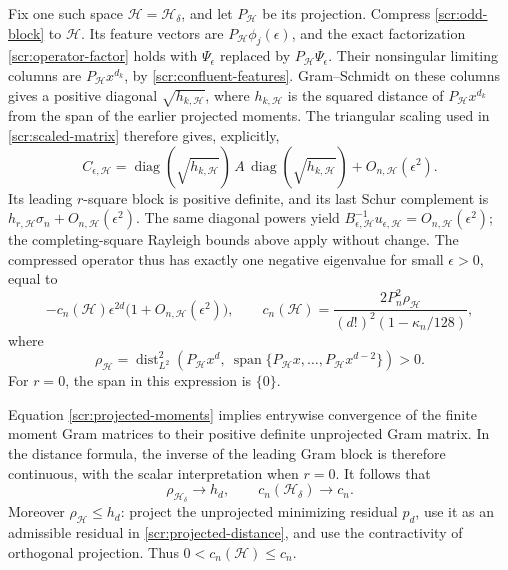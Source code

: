 Fix one such space \(\mathcal H=\mathcal H_\delta\), and let
\(P_{\mathcal H}\) be its projection. Compress
\eqref{scr:odd-block} to \(\mathcal H\). Its feature vectors
are \(P_{\mathcal H}\phi_j(\epsilon)\), and the exact
factorization \eqref{scr:operator-factor} holds with
\(\Psi_\epsilon\) replaced by \(P_{\mathcal H}\Psi_\epsilon\).
Their nonsingular limiting columns are
\(P_{\mathcal H}x^{d_k}\), by \eqref{scr:confluent-features}.
Gram--Schmidt on these columns gives a positive diagonal
\(\sqrt{h_{k,\mathcal H}}\), where \(h_{k,\mathcal H}\)
is the squared distance of \(P_{\mathcal H}x^{d_k}\) from the
span of the earlier projected moments. The triangular scaling
used in \eqref{scr:scaled-matrix} therefore gives, explicitly,
\[
 C_{\epsilon,\mathcal H}
    =\operatorname{diag}(\sqrt{h_{k,\mathcal H}})\,
          A\,\operatorname{diag}(\sqrt{h_{k,\mathcal H}})
                  +O_{n,\mathcal H}(\epsilon^2).
\]
Its leading \(r\)-square block is positive definite, and its
last Schur complement is
\(h_{r,\mathcal H}\sigma_n+O_{n,\mathcal H}(\epsilon^2)\).
The same diagonal powers yield
\(B_{\epsilon,\mathcal H}^{-1}u_{\epsilon,\mathcal H}
=O_{n,\mathcal H}(\epsilon^2)\); the completing-square
Rayleigh bounds above apply without change. The compressed
operator thus has exactly one negative eigenvalue for small
\(\epsilon>0\), equal to
\begin{equation}\label{scr:compressed-eigenvalue}
 -c_n(\mathcal H)\epsilon^{2d}
               \bigl(1+O_{n,\mathcal H}(\epsilon^2)\bigr),
 \qquad
 c_n(\mathcal H)=
   \frac{2P_n^2\rho_{\mathcal H}}
                  {(d!)^2(1-\kappa_n/128)},
\end{equation}
where
\begin{equation}\label{scr:projected-distance}
 \rho_{\mathcal H}
   =\operatorname{dist}_{L^2}^2
        \left(P_{\mathcal H}x^d,\
          \operatorname{span}\{P_{\mathcal H}x,\ldots,
                               P_{\mathcal H}x^{d-2}\}\right)>0.
\end{equation}
For \(r=0\), the span in this expression is \(\{0\}\).

Equation \eqref{scr:projected-moments} implies entrywise
convergence of the finite moment Gram matrices to their positive
definite unprojected Gram matrix. In the distance formula, the
inverse of the leading Gram block is therefore continuous, with
the scalar interpretation when \(r=0\). It follows that
\begin{equation}\label{scr:coefficient-recovery}
 \rho_{\mathcal H_\delta}\longrightarrow h_d,\qquad
 c_n(\mathcal H_\delta)\longrightarrow c_n.
\end{equation}
Moreover \(\rho_{\mathcal H}\le h_d\): project the unprojected
minimizing residual \(p_d\), use it as an admissible residual in
\eqref{scr:projected-distance}, and use the contractivity of
orthogonal projection. Thus \(0<c_n(\mathcal H)\le c_n\).

